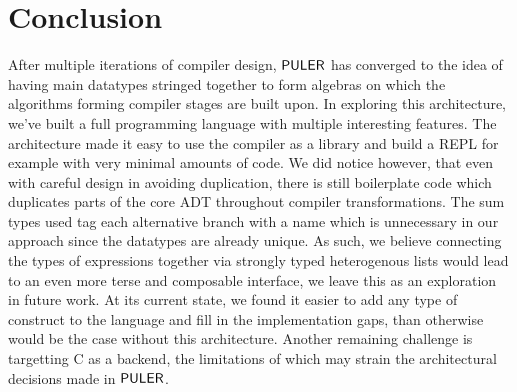 \chapter{Conclusion}
\label{conclusion}
\thispagestyle{myheadings}

After multiple iterations of compiler design, $\mathsf{PULER}$ has converged to the idea of having main datatypes stringed together to form algebras on which the algorithms forming compiler stages are built upon. In exploring this architecture, we've built a full programming language with multiple interesting features. The architecture made it easy to use the compiler as a library and build a REPL for example with very minimal amounts of code. We did notice however, that even with careful design in avoiding duplication, there is still boilerplate code which duplicates parts of the core ADT throughout compiler transformations. The sum types used tag each alternative branch with a name which is unnecessary in our approach since the datatypes are already unique. As such, we believe connecting the types of expressions together via strongly typed heterogenous lists \cite{hlist} would lead to an even more terse and composable interface, we leave this as an exploration in future work. 
At its current state, we found it easier to add any type of construct to the language and fill in the implementation gaps, than otherwise would be the case without this architecture.
Another remaining challenge is targetting C as a backend, the limitations of which may strain the architectural decisions made in $\mathsf{PULER}$.